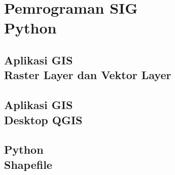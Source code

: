 \documentclass{WileySix}
\begin{document}
\part[Aplikasi SIG]
{Pemrograman SIG\\ Python}



\chapter[Raster Layer dan Vektor Layer]
{Aplikasi GIS\\ Raster Layer dan Vektor Layer}


\chapter[QGIS]
{Aplikasi GIS\\ Desktop QGIS}


\chapter[Python Shapefile]
{Python\\ Shapefile}










\printindex
\end{document}
